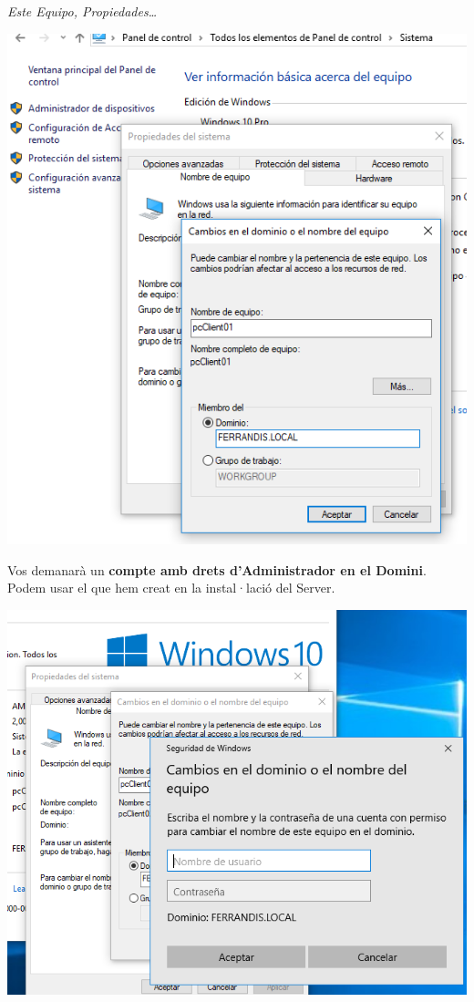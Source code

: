 \documentclass[
  a4paper,
]{article}
\begin{document}
\emph{Este Equipo, Propiedades\ldots{}}

\includegraphics{png/18.png}

Vos demanarà un \textbf{compte amb drets d'Administrador en el Domini}.
Podem usar el que hem creat en la instal·lació del Server.

\includegraphics{png/demanacompteadministradordeldomini.png}
\end{document}
